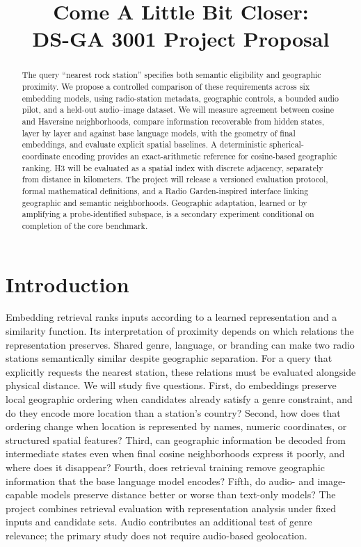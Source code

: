 \documentclass[10pt]{article}
\title{Come A Little Bit Closer:\\DS-GA 3001 Project Proposal}
\begin{document}
\maketitle
\begin{abstract}
The query ``nearest rock station'' specifies both semantic eligibility and geographic proximity. We propose a controlled comparison of these requirements across six embedding models, using radio-station metadata, geographic controls, a bounded audio pilot, and a held-out audio--image dataset. We will measure agreement between cosine and Haversine neighborhoods, compare information recoverable from hidden states, layer by layer and against base language models, with the geometry of final embeddings, and evaluate explicit spatial baselines. A deterministic spherical-coordinate encoding provides an exact-arithmetic reference for cosine-based geographic ranking. H3 will be evaluated as a spatial index with discrete adjacency, separately from distance in kilometers. The project will release a versioned evaluation protocol, formal mathematical definitions, and a Radio Garden-inspired interface linking geographic and semantic neighborhoods. Geographic adaptation, learned or by amplifying a probe-identified subspace, is a secondary experiment conditional on completion of the core benchmark.
\end{abstract}

\section{Introduction}
Embedding retrieval ranks inputs according to a learned representation and a similarity function. Its interpretation of proximity depends on which relations the representation preserves. Shared genre, language, or branding can make two radio stations semantically similar despite geographic separation. For a query that explicitly requests the nearest station, these relations must be evaluated alongside physical distance.
We will study five questions. First, do embeddings preserve local geographic ordering when candidates already satisfy a genre constraint, and do they encode more location than a station's country? Second, how does that ordering change when location is represented by names, numeric coordinates, or structured spatial features? Third, can geographic information be decoded from intermediate states even when final cosine neighborhoods express it poorly, and where does it disappear? Fourth, does retrieval training remove geographic information that the base language model encodes? Fifth, do audio- and image-capable models preserve distance better or worse than text-only models? The project combines retrieval evaluation with representation analysis under fixed inputs and candidate sets. Audio contributes an additional test of genre relevance; the primary study does not require audio-based geolocation.
\end{document}
